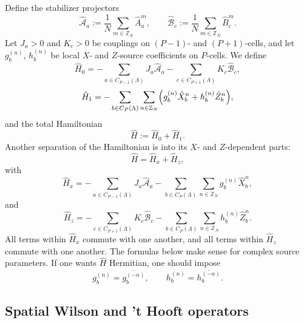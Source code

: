 Define the stabilizer projectors
\begin{equation}
	\hat{\mathcal A}_a
	:=
	\frac1N\sum_{m\in\mathbb Z_N}\hat A_a^m,
	\qquad
	\hat{\mathcal B}_c
	:=
	\frac1N\sum_{m\in\mathbb Z_N}\hat B_c^m.
	\label{eq:projectors}
\end{equation}
Let \(J_a>0\) and \(K_c>0\) be couplings on \((P-1)\)- and \((P+1)\)-cells, and let
\(g_b^{(n)}\), \(h_b^{(n)}\) be local \(X\)- and \(Z\)-source coefficients on \(P\)-cells.
We define
\begin{equation}
	\hat H_0
	=
	-\sum_{a\in C_{P-1}(\Lambda)}J_a\hat{\mathcal A}_a
	-\sum_{c\in C_{P+1}(\Lambda)}K_c\hat{\mathcal B}_c,
	\label{eq:H0}
\end{equation}
\begin{equation}
	\hat H_1
	=
	-\sum_{b\in C_P(\Lambda)}
	\sum_{n\in\mathbb Z_N}
	\Bigl(
	g_b^{(n)}\hat X_b^n+h_b^{(n)}\hat Z_b^n
	\Bigr),
	\label{eq:H1}
\end{equation}
and the total Hamiltonian
\begin{equation}
	\hat H:=\hat H_0+\hat H_1 .
	\label{eq:H}
\end{equation}
Another separation of the Hamiltonian is into its $X$- and $Z$-dependent parts: 
\begin{equation}
	\hat H=\hat H_x+\hat H_z,
\end{equation}
with
\begin{equation}
	\hat H_x
	=
	-\sum_{a\in C_{P-1}(\Lambda)}J_a\hat{\mathcal A}_a
	-\sum_{b\in C_P(\Lambda)}
	\sum_{n\in\mathbb Z_N}g_b^{(n)}\hat X_b^n,
	\label{eq:Hx}
\end{equation}
and
\begin{equation}
	\hat H_z
	=
	-\sum_{c\in C_{P+1}(\Lambda)}K_c\hat{\mathcal B}_c
	-\sum_{b\in C_P(\Lambda)}
	\sum_{n\in\mathbb Z_N}h_b^{(n)}\hat Z_b^n.
	\label{eq:Hz}
\end{equation}
All terms within \(\hat H_x\) commute with one another, and all terms within \(\hat H_z\)
commute with one another. The formulas below make sense for complex source parameters. If
one wants \(\hat H\) Hermitian, one should impose
\begin{equation}
g_b^{(n)}=\overline{g_b^{(-n)}},
\qquad
h_b^{(n)}=\overline{h_b^{(-n)}}.
\end{equation}

\subsection{Spatial Wilson and 't Hooft operators}
\label{sec:spatial-topological-operators}

